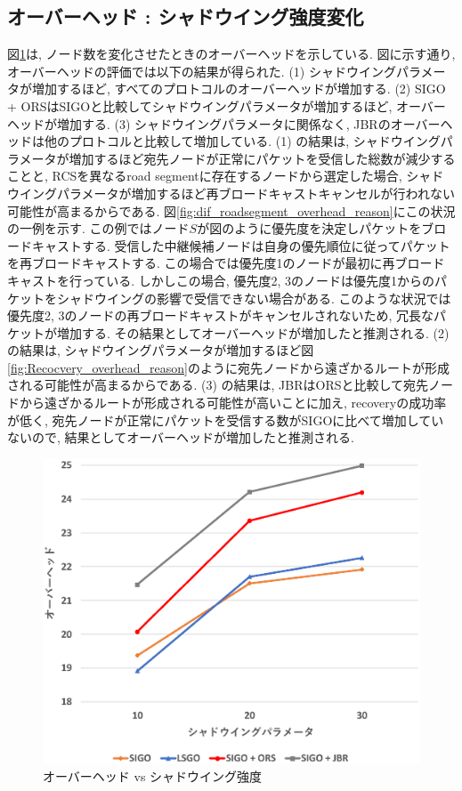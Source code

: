 \documentclass[10pt]{jreport}
\begin{document}
\subsection{オーバーヘッド : シャドウイング強度変化}
図\ref{fig:SIGO_overhead_shadow}は, ノード数を変化させたときのオーバーヘッドを示している.
図に示す通り, オーバーヘッドの評価では以下の結果が得られた.
(1) シャドウイングパラメータが増加するほど, すべてのプロトコルのオーバーヘッドが増加する.
(2) SIGO + ORSはSIGOと比較してシャドウイングパラメータが増加するほど, オーバーヘッドが増加する.
(3) シャドウイングパラメータに関係なく, JBRのオーバーヘッドは他のプロトコルと比較して増加している.
(1) の結果は, シャドウイングパラメータが増加するほど宛先ノードが正常にパケットを受信した総数が減少することと, RCSを異なるroad segmentに存在するノードから選定した場合, シャドウイングパラメータが増加するほど再ブロードキャストキャンセルが行われない可能性が高まるからである. 図\ref{fig:dif_roadsegment_overhead_reason}にこの状況の一例を示す.
この例ではノード$S$が図のように優先度を決定しパケットをブロードキャストする. 受信した中継候補ノードは自身の優先順位に従ってパケットを再ブロードキャストする. この場合では優先度1のノードが最初に再ブロードキャストを行っている. しかしこの場合, 優先度2, 3のノードは優先度1からのパケットをシャドウイングの影響で受信できない場合がある. このような状況では優先度2, 3のノードの再ブロードキャストがキャンセルされないため, 冗長なパケットが増加する. その結果としてオーバーヘッドが増加したと推測される.
(2) の結果は, シャドウイングパラメータが増加するほど図\ref{fig:Recocvery_overhead_reason}のように宛先ノードから遠ざかるルートが形成される可能性が高まるからである. 
(3) の結果は, JBRはORSと比較して宛先ノードから遠ざかるルートが形成される可能性が高いことに加え, recoveryの成功率が低く, 宛先ノードが正常にパケットを受信する数がSIGOに比べて増加していないので, 結果としてオーバーヘッドが増加したと推測される.


\begin{figure}[!ht]
	\centering
	\includegraphics[width=120mm]{figures/SIGO_overhead_shadow.eps}
	\caption{オーバーヘッド vs シャドウイング強度}
	\label{fig:SIGO_overhead_shadow}
\end{figure}
\end{document}
